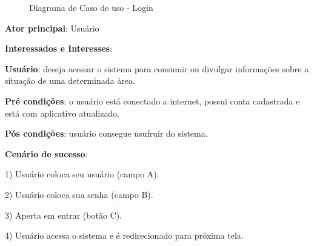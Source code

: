 \documentclass[12pt]{article}
\begin{document}
  \begin{figure}[!htb]
    \caption{\label{fig:diagUseCase01} Diagrama de Caso de uso - Login}
  \end{figure}

\textbf{Ator principal}: Usuário

\textbf{Interessados e Interesses}:

\textbf{Usuário}: deseja acessar o sistema para consumir ou divulgar informações sobre a situação de uma determinada área.

\textbf{Pré condições}: o usuário está conectado a internet, possui conta cadastrada e está com aplicativo atualizado.

\textbf{Pós condições}: usuário consegue usufruir do sistema.

\textbf{Cenário de sucesso}:

1) Usuário coloca seu usuário (campo A).

2) Usuário coloca sua senha (campo B).

3) Aperta em entrar (botão C).

4) Usuário acessa o sistema e é redirecionado para próxima tela.
\end{document}
